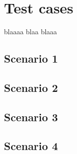 \chapter{Test cases}

	blaaaa blaa blaaa

	\clearpage

	\section{Scenario 1}

	\section{Scenario 2}

	\section{Scenario 3}

	\section{Scenario 4}